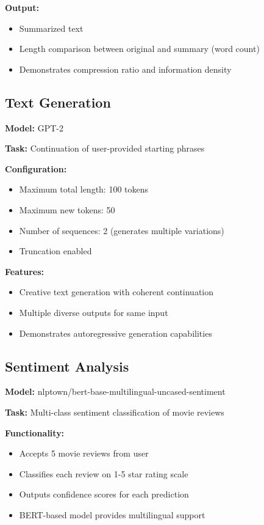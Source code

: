 \documentclass[12pt,a4paper]{article}
\begin{document}
\textbf{Output:}
\begin{itemize}
    \item Summarized text
    \item Length comparison between original and summary (word count)
    \item Demonstrates compression ratio and information density
\end{itemize}

\subsection{Text Generation}

\textbf{Model:} GPT-2

\textbf{Task:} Continuation of user-provided starting phrases

\textbf{Configuration:}
\begin{itemize}
    \item Maximum total length: 100 tokens
    \item Maximum new tokens: 50
    \item Number of sequences: 2 (generates multiple variations)
    \item Truncation enabled
\end{itemize}

\textbf{Features:}
\begin{itemize}
    \item Creative text generation with coherent continuation
    \item Multiple diverse outputs for same input
    \item Demonstrates autoregressive generation capabilities
\end{itemize}

\subsection{Sentiment Analysis}

\textbf{Model:} nlptown/bert-base-multilingual-uncased-sentiment

\textbf{Task:} Multi-class sentiment classification of movie reviews

\textbf{Functionality:}
\begin{itemize}
    \item Accepts 5 movie reviews from user
    \item Classifies each review on 1-5 star rating scale
    \item Outputs confidence scores for each prediction
    \item BERT-based model provides multilingual support
\end{itemize}
\end{document}
